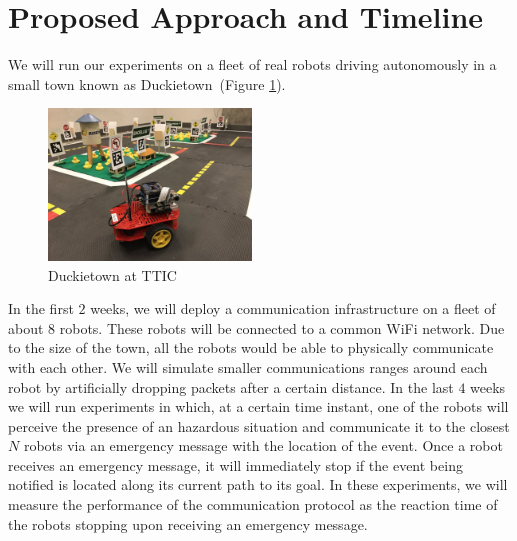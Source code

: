\documentclass{article}
\begin{document}
\section*{Proposed Approach and Timeline}
\vspace{-.3cm}
We will run our experiments on a fleet of real robots driving autonomously in a small town 
known as Duckietown~(Figure \ref{fig:duckietown}).

\begin{figure}
    \centering
    \vspace{-12pt}
    \includegraphics[width=0.48\textwidth]{figures/duckietown.jpg}
    \caption{Duckietown at TTIC \label{fig:duckietown}}
    \vspace{-6pt}
\end{figure}

In the first $2$ weeks, we will deploy a communication infrastructure on a fleet of about 8 robots.
These robots will be connected to a common WiFi network.
Due to the size of the town, all the robots would be able to physically communicate with each other.
We will simulate smaller communications ranges around each robot by artificially dropping packets after a 
certain distance.
In the last $4$ weeks we will run experiments in which, at a certain time instant, one of the robots will perceive
the presence of an hazardous situation and communicate it to the closest $N$ robots via an emergency message
with the location of the event. Once a robot receives an emergency message, it will immediately stop if the 
event being notified is located along its current path to its goal. In these experiments,
we will measure the performance of the communication protocol as the reaction time of the robots stopping 
upon receiving an emergency message.
\end{document}
